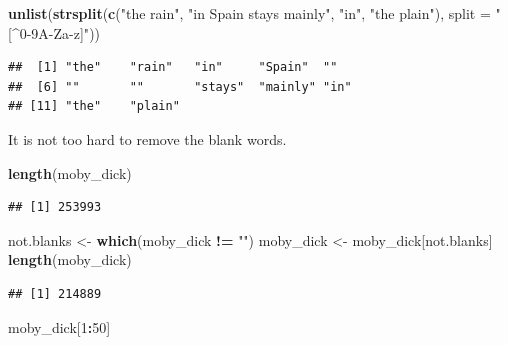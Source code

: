\documentclass[
]{krantz}
\newenvironment{Shaded}{\begin{snugshade}}{\end{snugshade}}
\newcommand{\DataTypeTok}[1]{\textcolor[rgb]{0.13,0.29,0.53}{#1}}
\newcommand{\DecValTok}[1]{\textcolor[rgb]{0.00,0.00,0.81}{#1}}
\newcommand{\KeywordTok}[1]{\textcolor[rgb]{0.13,0.29,0.53}{\textbf{#1}}}
\newcommand{\NormalTok}[1]{#1}
\newcommand{\OperatorTok}[1]{\textcolor[rgb]{0.81,0.36,0.00}{\textbf{#1}}}
\newcommand{\StringTok}[1]{\textcolor[rgb]{0.31,0.60,0.02}{#1}}
\begin{document}
\begin{Shaded}
\begin{Highlighting}[]
\KeywordTok{unlist}\NormalTok{(}\KeywordTok{strsplit}\NormalTok{(}\KeywordTok{c}\NormalTok{(}\StringTok{"the rain"}\NormalTok{, }\StringTok{"in Spain    stays mainly"}\NormalTok{, }\StringTok{"in"}\NormalTok{, }\StringTok{"the plain"}\NormalTok{), }
        \DataTypeTok{split =} \StringTok{"[\^{}0{-}9A{-}Za{-}z]"}\NormalTok{))}
\end{Highlighting}
\end{Shaded}

\begin{verbatim}
##  [1] "the"    "rain"   "in"     "Spain"  ""      
##  [6] ""       ""       "stays"  "mainly" "in"    
## [11] "the"    "plain"
\end{verbatim}

It is not too hard to remove the blank words.

\begin{Shaded}
\begin{Highlighting}[]
\KeywordTok{length}\NormalTok{(moby\_dick)}
\end{Highlighting}
\end{Shaded}

\begin{verbatim}
## [1] 253993
\end{verbatim}

\begin{Shaded}
\begin{Highlighting}[]
\NormalTok{not.blanks \textless{}{-}}\StringTok{ }\KeywordTok{which}\NormalTok{(moby\_dick }\OperatorTok{!=}\StringTok{ ""}\NormalTok{)}
\NormalTok{moby\_dick \textless{}{-}}\StringTok{ }\NormalTok{moby\_dick[not.blanks]}
\KeywordTok{length}\NormalTok{(moby\_dick)}
\end{Highlighting}
\end{Shaded}

\begin{verbatim}
## [1] 214889
\end{verbatim}

\begin{Shaded}
\begin{Highlighting}[]
\NormalTok{moby\_dick[}\DecValTok{1}\OperatorTok{:}\DecValTok{50}\NormalTok{]}
\end{Highlighting}
\end{Shaded}
\end{document}

